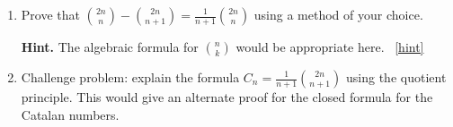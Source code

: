 \documentclass{book}
\begin{document}
\setcounter{project}{183}
\addtocounter{project}{-1}
\begin{activity}[]\label{activity-176}
\leavevmode%
\begin{enumerate}[font=\bfseries,label=(\alph*),ref=\alph*]
\item\label{task-198} \hypertarget{p-1077}{}%
Prove that \(\binom{2n}{n} - \binom{2n}{n+1} = \frac{1}{n+1}\binom{2n}{n}\) using a method of your choice.%
\par\smallskip%
\noindent\textbf{Hint.}\hypertarget{hint-124}{}\quad%
\hypertarget{p-1078}{}%
The algebraic formula for \(\binom{n}{k}\) would be appropriate here.%
~\hfill{\tiny\hyperlink{a-183.a}{[hint]}\hypertarget{q-183.a}{}}\item\label{task-199} \hypertarget{p-1079}{}%
Challenge problem: explain the formula \(C_n = \frac{1}{n+1}\binom{2n}{n+1}\) using the quotient principle.  This would give an alternate proof for the closed formula for the Catalan numbers.%
\end{enumerate}
\end{activity}
\end{document}
